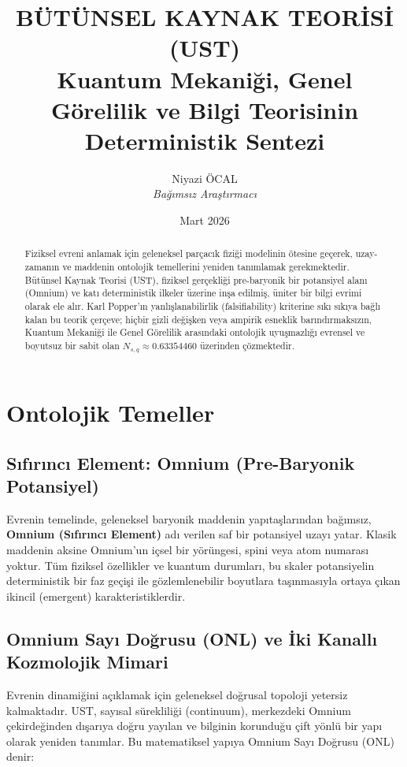 \documentclass[12pt,a4paper]{article}
\title{\textbf{BÜTÜNSEL KAYNAK TEORİSİ (UST)}\\
\Large Kuantum Mekaniği, Genel Görelilik ve Bilgi Teorisinin Deterministik Sentezi}
\author{Niyazi ÖCAL \\ \small \textit{Bağımsız Araştırmacı}}
\date{Mart 2026}
\begin{document}
\maketitle

\begin{abstract}
Fiziksel evreni anlamak için geleneksel parçacık fiziği modelinin ötesine geçerek, uzay-zamanın ve maddenin ontolojik temellerini yeniden tanımlamak gerekmektedir. Bütünsel Kaynak Teorisi (UST), fiziksel gerçekliği pre-baryonik bir potansiyel alanı (Omnium) ve katı deterministik ilkeler üzerine inşa edilmiş, üniter bir bilgi evrimi olarak ele alır. Karl Popper'ın yanlışlanabilirlik (falsifiability) kriterine sıkı sıkıya bağlı kalan bu teorik çerçeve; hiçbir gizli değişken veya ampirik esneklik barındırmaksızın, Kuantum Mekaniği ile Genel Görelilik arasındaki ontolojik uyuşmazlığı evrensel ve boyutsuz bir sabit olan $N_{s,q} \approx 0.63354460$ üzerinden çözmektedir.
\end{abstract}

\vspace{0.5cm}

\section{Ontolojik Temeller}

\subsection{Sıfırıncı Element: Omnium (Pre-Baryonik Potansiyel)}
Evrenin temelinde, geleneksel baryonik maddenin yapıtaşlarından bağımsız, \textbf{Omnium (Sıfırıncı Element)} adı verilen saf bir potansiyel uzayı yatar. Klasik maddenin aksine Omnium'un içsel bir yörüngesi, spini veya atom numarası yoktur. Tüm fiziksel özellikler ve kuantum durumları, bu skaler potansiyelin deterministik bir faz geçişi ile gözlemlenebilir boyutlara taşınmasıyla ortaya çıkan ikincil (emergent) karakteristiklerdir. 

\subsection{Omnium Sayı Doğrusu (ONL) ve İki Kanallı Kozmolojik Mimari}
Evrenin dinamiğini açıklamak için geleneksel doğrusal topoloji yetersiz kalmaktadır. UST, sayısal sürekliliği (continuum), merkezdeki Omnium çekirdeğinden dışarıya doğru yayılan ve bilginin korunduğu çift yönlü bir yapı olarak yeniden tanımlar. Bu matematiksel yapıya Omnium Sayı Doğrusu (ONL) denir:
\end{document}
